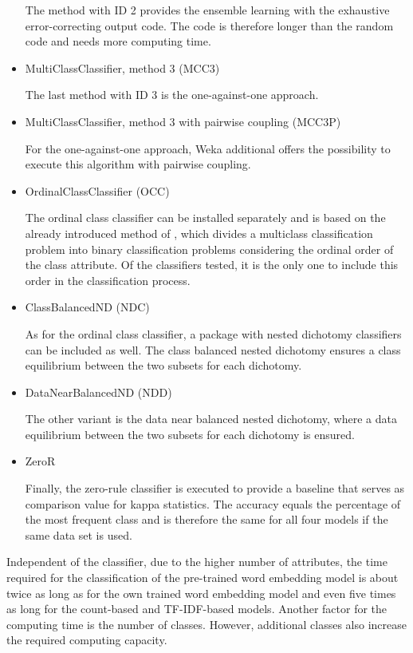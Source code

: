\documentclass[article,type=msc,colorback,accentcolor=tud7b]{tudthesis}
\begin{document}
\begin{itemize}
        The method with ID 2 provides the ensemble learning with the exhaustive error-correcting output code. The code is therefore longer than the random code and needs more computing time.
      \item MultiClassClassifier, method 3 (MCC3)

        The last method with ID 3 is the one-against-one approach.
      \item MultiClassClassifier, method 3 with pairwise coupling (MCC3P)

        For the one-against-one approach, Weka additional offers the possibility to execute this algorithm with pairwise coupling.
      \item OrdinalClassClassifier (OCC)

        The ordinal class classifier can be installed separately and is based on the already introduced method of \citeauthor{Frank2001}, which divides a multiclass classification problem into binary classification problems considering the ordinal order of the class attribute. Of the classifiers tested, it is the only one to include this order in the classification process.
      \item ClassBalancedND (NDC)

        As for the ordinal class classifier, a package with nested dichotomy classifiers can be included as well. The class balanced nested dichotomy ensures a class equilibrium between the two subsets for each dichotomy.
      \item DataNearBalancedND (NDD)

        The other variant is the data near balanced nested dichotomy, where a data equilibrium between the two subsets for each dichotomy is ensured.
      \item ZeroR

        Finally, the zero-rule classifier is executed to provide a baseline that serves as comparison value for kappa statistics. The accuracy equals the percentage of the most frequent class and is therefore the same for all four models if the same data set is used.
    \end{itemize}
    Independent of the classifier, due to the higher number of attributes, the time required for the classification of the pre-trained word embedding model is about twice as long as for the own trained word embedding model and even five times as long for the count-based and TF-IDF-based models. Another factor for the computing time is the number of classes. However, additional classes also increase the required computing capacity. \\\\
\end{document}
